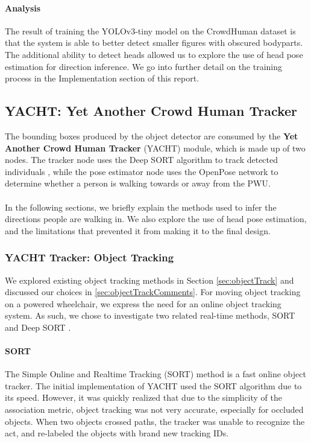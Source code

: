 \paragraph{Analysis}
The result of training the YOLOv3-tiny model on the CrowdHuman dataset is that the system is able to better detect smaller figures with obscured bodyparts. The additional ability to detect heads allowed us to explore the use of head pose estimation for direction inference. We go into further detail on the training process in the Implementation section of this report.

\subsection{YACHT: Yet Another Crowd Human Tracker}
The bounding boxes produced by the object detector are consumed by the \textbf{Yet Another Crowd Human Tracker} (YACHT) module, which is made up of two nodes. The tracker node uses the Deep SORT algorithm to track detected individuals \cite{Wojke2018}, while the pose estimator node uses the OpenPose \cite{Cao2017} network to determine whether a person is walking towards or away from the PWU.

\paragraph{}In the following sections, we briefly explain the  methods used to infer the directions people are walking in. We also explore the use of head pose estimation, and the limitations that prevented it from making it to the final design.

\subsubsection{YACHT Tracker: Object Tracking}
We explored existing object tracking methods in Section \ref{sec:objectTrack} and discussed our choices in \ref{sec:objectTrackComments}. For moving object tracking on a powered wheelchair, we express the need for an online object tracking system. As such, we chose to investigate two related real-time methods, SORT \cite{Bewley2016} and Deep SORT \cite{Wojke2018}.

\paragraph{SORT}  The Simple Online and Realtime Tracking (SORT) method is a fast online object tracker. The initial implementation of YACHT used the SORT algorithm due to its speed. However, it was quickly realized that due to the simplicity of the association metric, object tracking was not very accurate, especially for occluded objects. When two objects crossed paths, the tracker was unable to recognize the act, and re-labeled the objects with brand new tracking IDs.

